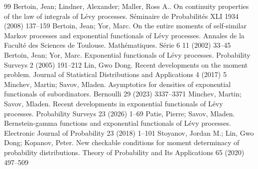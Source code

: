 \documentclass[10pt,a4paper]{amsart}
\newcommand{\1}{\mathbf 1}
\begin{document}
\begin{thebibliography}{99}
 Bertoin, Jean; Lindner, Alexander; Maller, Ross A.. On continuity properties of the law of integrals of {L}{\'e}vy processes. S{\'e}minaire de Probabilit{\'e}s {XLI 1934 (2008) 137--159
 Bertoin, Jean; Yor, Marc. On the entire moments of self-similar {M}arkov processes and exponential functionals of {L}{\'e}vy processes. Annales de la Facult{\'e} des Sciences de Toulouse. Math{\'e}matiques. S{\'e}rie 6 11 (2002) 33--45
 Bertoin, Jean; Yor, Marc. Exponential functionals of {L}{\'e}vy processes. Probability Surveys 2 (2005) 191--212
 Lin, Gwo Dong. Recent developments on the moment problem. Journal of Statistical Distributions and Applications 4 (2017) 5
 Minchev, Martin; Savov, Mladen. Asymptotics for densities of exponential functionals of subordinators. Bernoulli 29 (2023) 3337--3371
 Minchev, Martin; Savov, Mladen. Recent developments in exponential functionals of {L}{\'e}vy processes. Probability Surveys 23 (2026) 1--69
 Patie, Pierre; Savov, Mladen. B}ernstein-gamma functions and exponential functionals of {L}{\'e}vy processes. Electronic Journal of Probability 23 (2018) 1--101
 Stoyanov, Jordan M.; Lin, Gwo Dong; Kopanov, Peter. New checkable conditions for moment determinacy of probability distributions. Theory of Probability and Its Applications 65 (2020) 497--509
\end{thebibliography}
\end{document}
